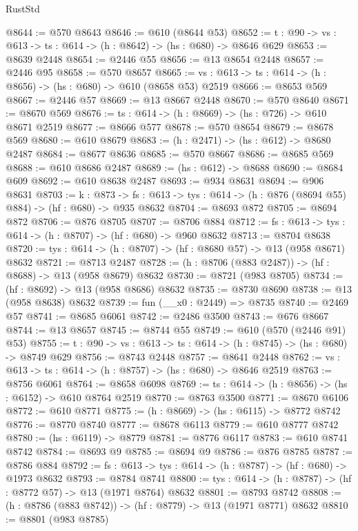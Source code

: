 \begin{lexlean}{RustStd}
\begin{coremodule}
@8644 := @570 @8643
@8646 := @610 (@8644 @53)
@8652 := {t : @90} -> {vs : @613} -> {ts : @614} -> (h : @8642) -> (hs : @680) -> @8646 @629
@8653 := @8639 @2448
@8654 := @2446 @55
@8656 := @13 @8654 @2448
@8657 := @2446 @95
@8658 := @570 @8657
@8665 := {vs : @613} -> {ts : @614} -> (h : @8656) -> (hs : @680) -> @610 (@8658 @53) @2519
@8666 := @8653 @569
@8667 := @2446 @57
@8669 := @13 @8667 @2448
@8670 := @570 @8640
@8671 := @8670 @569
@8676 := {ts : @614} -> (h : @8669) -> (hs : @726) -> @610 @8671 @2519
@8677 := @8666 @577
@8678 := @570 @8654
@8679 := @8678 @569
@8680 := @610 @8679
@8683 := (h : @2471) -> (hs : @612) -> @8680 @2487
@8684 := @8677 @8636
@8685 := @570 @8667
@8686 := @8685 @569
@8688 := @610 @8686 @2487
@8689 := (hs : @612) -> @8688
@8690 := @8684 @609
@8692 := @610 @8638 @2487
@8693 := @934 @8631
@8694 := @906 @8631
@8703 := {k : @873} ->
  {fs : @613} -> {tys : @614} -> (h : @876 (@8694 @55) @884) -> (hf : @680) -> @935 @8632
@8704 := @8693 @872
@8705 := @8694 @872
@8706 := @876 @8705
@8707 := @8706 @884
@8712 := {fs : @613} -> {tys : @614} -> (h : @8707) -> (hf : @680) -> @960 @8632
@8713 := @8704 @8638
@8720 := {tys : @614} -> (h : @8707) -> (hf : @8680 @57) -> @13 (@958 @8671) @8632
@8721 := @8713 @2487
@8728 := (h : @8706 (@883 @2487)) -> (hf : @8688) -> @13 (@958 @8679) @8632
@8730 := @8721 (@983 @8705)
@8734 := (hf : @8692) -> @13 (@958 @8686) @8632
@8735 := @8730 @8690
@8738 := @13 (@958 @8638) @8632
@8739 := fun (__x0 : @2449) => @8735
@8740 := @2469 @57
@8741 := @8685 @6061
@8742 := @2486 @3500
@8743 := @676 @8667
@8744 := @13 @8657
@8745 := @8744 @55
@8749 := @610 (@570 (@2446 @91) @53)
@8755 := {t : @90} -> {vs : @613} -> {ts : @614} -> (h : @8745) -> (hs : @680) -> @8749 @629
@8756 := @8743 @2448
@8757 := @8641 @2448
@8762 := {vs : @613} -> {ts : @614} -> (h : @8757) -> (hs : @680) -> @8646 @2519
@8763 := @8756 @6061
@8764 := @8658 @6098
@8769 := {ts : @614} -> (h : @8656) -> (hs : @6152) -> @610 @8764 @2519
@8770 := @8763 @3500
@8771 := @8670 @6106
@8772 := @610 @8771
@8775 := (h : @8669) -> (hs : @6115) -> @8772 @8742
@8776 := @8770 @8740
@8777 := @8678 @6113
@8779 := @610 @8777 @8742
@8780 := (hs : @6119) -> @8779
@8781 := @8776 @6117
@8783 := @610 @8741 @8742
@8784 := @8693 @9
@8785 := @8694 @9
@8786 := @876 @8785
@8787 := @8786 @884
@8792 := {fs : @613} -> {tys : @614} -> (h : @8787) -> (hf : @680) -> @1973 @8632
@8793 := @8784 @8741
@8800 := {tys : @614} -> (h : @8787) -> (hf : @8772 @57) -> @13 (@1971 @8764) @8632
@8801 := @8793 @8742
@8808 := (h : @8786 (@883 @8742)) -> (hf : @8779) -> @13 (@1971 @8771) @8632
@8810 := @8801 (@983 @8785)

\end{coremodule}
\end{lexlean}
